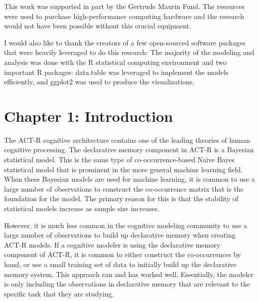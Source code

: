 \documentclass[man,floatsintext,donotrepeattitle]{apa6}
\begin{document}
This work was supported in part by the Gertrude Maurin Fund.
The resources were used to purchase high-performance computing hardware and the research would not have been possible without this crucial equipment.

I would also like to thank the creators of a few open-sourced software packages that were heavily leveraged to do this research:
The majority of the modeling and analysis was done with the R statistical computing environment \parencite{RCoreTeam2014} and two important R packages:
data.table \parencite{Dowle2014} was leveraged to implement the models efficiently, and ggplot2 \parencite{Wickham2009} was used to produce the visualizations.

\newpage

\thispagestyle{empty}
\tableofcontents
\newpage

\thispagestyle{empty}
\listoftables
\newpage

\thispagestyle{empty}
\listoffigures
\newpage


\section{Chapter 1: Introduction}

The ACT-R cognitive architecture \parencite{Anderson2007} contains one of the leading theories of human cognitive processing.
The declarative memory component in ACT-R is a Bayesian statistical model.
This is the same type of co-occurrence-based Naive Bayes statistical model that is prominent in the more general machine learning field.
When these Bayesian models are used for machine learning, it is common to use a large number of observations to construct the co-occurrence matrix that is the foundation for the model.
The primary reason for this is that the stability of statistical models increase as sample size increases.

However, it is much less common in the cognitive modeling community to use a large number of observations to build up declarative memory when creating ACT-R models.
If a cognitive modeler is using the declarative memory component of ACT-R,
it is common to either construct the co-occurrences by hand, or use a small training set of data to initially build up the declarative memory system.
This approach can and has worked well.
Essentially, the modeler is only including the observations in declarative memory that are relevant to the specific task that they are studying.
\end{document}
